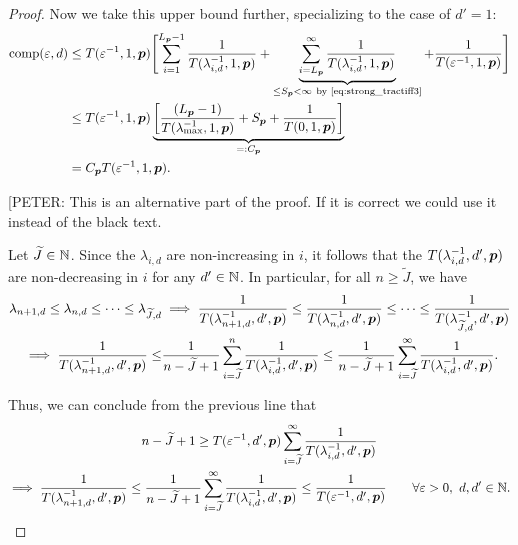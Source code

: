 \documentclass[11pt,a4paper]{article}
\newcommand{\peter}[1]{\begingroup\color{purple}#1\endgroup}
\begin{document}
\begin{proof}
Now we take this upper bound further, specializing to the case of $d'=1$:
\begin{align*}
       \operatorname{comp}(\varepsilon,d)
       & \le T(\varepsilon^{-1},1, \boldsymbol{p}) \Biggl [ \sum_{i=1}^{L_{\boldsymbol{p}}-1} \frac{1}{T(\lambda_{i, d}^{-1},1,\boldsymbol{p})}
       + \underbrace{\sum_{i=L_{\boldsymbol{p}}}^\infty \frac{1}{T(\lambda_{i, d}^{-1},1,\boldsymbol{p})}}_{\le S_{\boldsymbol{p}} <\infty\ \text{by \eqref{eq:strong_tractiff3}} }
       + \frac{1}{T(\varepsilon^{-1},1, \boldsymbol{p})} \Biggr] \\
       & \le T(\varepsilon^{-1},1,\boldsymbol{p}) \underbrace{\left[\frac{(L_{\boldsymbol{p}}-1)}{T(\lambda_{\max}^{-1},1,\boldsymbol{p})} + S_{\boldsymbol{p}} + \frac{1}{T(0,1, \boldsymbol{p})}\right]}_{=:C_{\boldsymbol{p}}}\\
       & =  C_{\boldsymbol{p}}T(\varepsilon^{-1},1,\boldsymbol{p}).
\end{align*}

\peter{
[PETER: This is an alternative part of the proof. If it is correct we could use it instead of the black text. 

\bigskip

Let $\widetilde{J}\in\mathbb{N}$. Since the $\lambda_{i,d}$ are non-increasing in $i$, it follows that the $T(\lambda_{i,d}^{-1},d',\boldsymbol{p})$ are non-decreasing in $i$ for any $d'\in\mathbb{N}$. In particular, for all $n\ge \widetilde{J}$, we have
\begin{align*}
    \lambda_{n+1,d} \le \lambda_{n,d} \le \cdots \le \lambda_{\widetilde{J},d}
    & \implies \frac{1}{T(\lambda_{n+1, d}^{-1},d',\boldsymbol{p})} \le \frac{1}{T(\lambda_{n, d}^{-1},d',\boldsymbol{p})} \le \cdots \le \frac{1}{T(\lambda_{\widetilde{J}, d}^{-1},d',\boldsymbol{p})} \\
     \implies \frac{1}{T(\lambda_{n+1, d}^{-1},d',\boldsymbol{p}) }
    \le &\frac{1}{n-\widetilde{J}+1} \sum_{i=\widetilde{J}}^n  \frac{1}{T(\lambda_{i, d}^{-1},d',\boldsymbol{p}) }
    \le \frac{1}{n-\widetilde{J}+1} \sum_{i=\widetilde{J}}^\infty  \frac{1}{T(\lambda_{i, d}^{-1},d',\boldsymbol{p})}.
\end{align*}


Thus, we can conclude from the previous line that
\begin{multline} \label{eq:implicate_a}
    n - \widetilde{J} +1 \ge T(\varepsilon^{-1},d',\boldsymbol{p}) \sum_{i=\widetilde{J}}^\infty \frac{1}{T(\lambda_{i, d}^{-1},d',\boldsymbol{p})} \\
   \implies   \frac{1}{T(\lambda_{n+1, d}^{-1},d',\boldsymbol{p})} \le
   \frac{1}{n-\widetilde{J}+1} \sum_{i=\widetilde{J}}^\infty \frac{1}{T(\lambda_{i, d}^{-1},d',\boldsymbol{p}) } \le \frac{1}{T(\varepsilon^{-1},d',\boldsymbol{p})} \qquad \forall \varepsilon > 0, \ d,d' \in \mathbb{N}.
\end{multline}

}
\end{proof}
\end{document}
